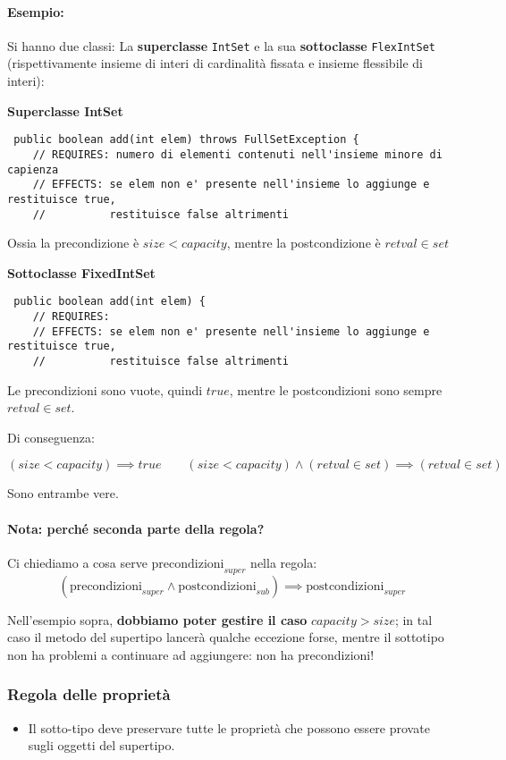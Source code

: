 \documentclass[a4paper,10pt]{article}
\begin{document}
\paragraph{Esempio:}
Si hanno due classi: La \textbf{superclasse} \texttt{IntSet} e la sua \textbf{sottoclasse} \texttt{FlexIntSet} (rispettivamente insieme di interi di cardinalità fissata e insieme flessibile di interi):\smallskip

\textbf{Superclasse IntSet}
\begin{lstlisting}
 public boolean add(int elem) throws FullSetException {
    // REQUIRES: numero di elementi contenuti nell'insieme minore di capienza
    // EFFECTS: se elem non e' presente nell'insieme lo aggiunge e restituisce true,
    //          restituisce false altrimenti
\end{lstlisting}

Ossia la precondizione è $size < capacity$, mentre la postcondizione è $retval \in set$

\smallskip
\textbf{Sottoclasse FixedIntSet}
\begin{lstlisting}
 public boolean add(int elem) {
    // REQUIRES:
    // EFFECTS: se elem non e' presente nell'insieme lo aggiunge e restituisce true,
    //          restituisce false altrimenti
\end{lstlisting}

Le precondizioni sono vuote, quindi $true$, mentre le postcondizioni sono sempre $retval \in set$.\medskip

Di conseguenza:

\[ (size < capacity) \implies true \quad\quad (size < capacity) \wedge (retval \in set) \implies (retval \in set) \]

Sono entrambe vere.

\paragraph{Nota: perché seconda parte della regola?}
Ci chiediamo a cosa serve $\text{precondizioni}_{super}$ nella regola:
\[ (\text{precondizioni}_{super} \wedge \text{postcondizioni}_{sub}) \implies \text{postcondizioni}_{super} \]

Nell'esempio sopra, \textbf{dobbiamo poter gestire il caso} $capacity > size$; in tal caso il metodo del supertipo lancerà qualche eccezione forse, mentre il sottotipo non ha problemi a continuare ad aggiungere: non ha precondizioni!

\subsubsection{Regola delle proprietà}
\begin{itemize}
 \item Il sotto-tipo deve preservare tutte le proprietà che possono essere provate sugli oggetti del supertipo.
\end{itemize}
\end{document}

